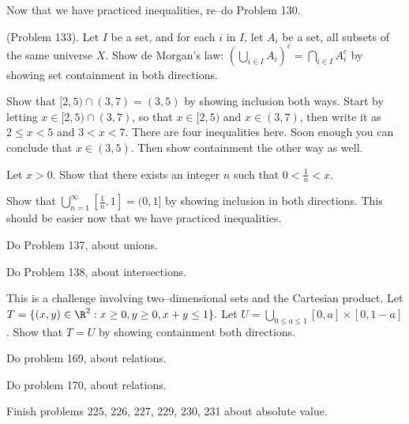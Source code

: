 \item Now that we have practiced inequalities, re--do Problem 130.

\item (Problem 133).  Let $I$ be a set, and for each $i$ in $I$, let $A_i$ be a set, all subsets of the same universe $X$.
Show de Morgan's law:  $\left( \bigcup_{i \in I} A_i \right)^c = \bigcap_{i \in I} A_i^c$ by showing set containment in both directions.

\item Show that $[2,5) \cap (3,7) = (3,5)$ by showing inclusion both ways.
Start by letting $x \in [2,5) \cap (3,7)$, so that $x \in [2,5)$ and $x \in (3,7)$, then write it as $2 \leq x < 5$ and $3 < x < 7$.
There are four inequalities here.  Soon enough you can conclude that $x \in (3,5)$.
Then show containment the other way as well.

\item Let $x > 0$.
Show that there exists an integer $n$ such that $0 < \frac{1}{n} < x$.

\item Show that $\bigcup_{n=1}^{\infty} [\frac{1}{n}, 1] = (0,1]$ by showing inclusion in both directions.
This should be easier now that we have practiced inequalities.

\item Do Problem 137, about unions.

\item Do Problem 138, about intersections.

\item This is a challenge involving two--dimensional sets and the Cartesian product.
Let $T = \{ (x,y) \in \R^2 : x \geq 0, y \geq 0, x+y\leq 1\}.$
Let $U = \bigcup_{0 \leq a \leq 1} [0,a]\times[0,1-a]$.
Show that $T = U$ by showing containment both directions.

\item Do problem 169, about relations.

\item Do problem 170, about relations.

\item Finish problems 225, 226, 227, 229, 230, 231 about absolute value.

\elist

\vfill          %
